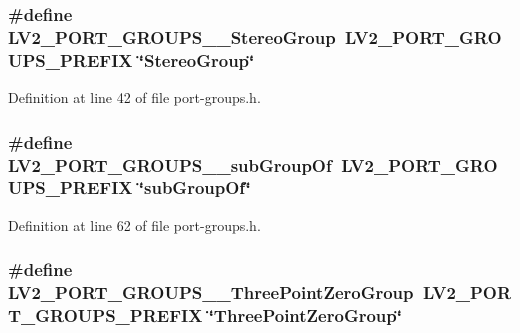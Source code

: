 \subsubsection[{\texorpdfstring{L\+V2\+\_\+\+P\+O\+R\+T\+\_\+\+G\+R\+O\+U\+P\+S\+\_\+\+\_\+\+Stereo\+Group}{LV2_PORT_GROUPS__StereoGroup}}]{\setlength{\rightskip}{0pt plus 5cm}\#define L\+V2\+\_\+\+P\+O\+R\+T\+\_\+\+G\+R\+O\+U\+P\+S\+\_\+\+\_\+\+Stereo\+Group~{\bf L\+V2\+\_\+\+P\+O\+R\+T\+\_\+\+G\+R\+O\+U\+P\+S\+\_\+\+P\+R\+E\+F\+IX} \char`\"{}Stereo\+Group\char`\"{}}\hypertarget{port-groups_8h_acc1615a1369cab145421ae7dddb26379}{}\label{port-groups_8h_acc1615a1369cab145421ae7dddb26379}


Definition at line 42 of file port-\/groups.\+h.

\subsubsection[{\texorpdfstring{L\+V2\+\_\+\+P\+O\+R\+T\+\_\+\+G\+R\+O\+U\+P\+S\+\_\+\+\_\+sub\+Group\+Of}{LV2_PORT_GROUPS__subGroupOf}}]{\setlength{\rightskip}{0pt plus 5cm}\#define L\+V2\+\_\+\+P\+O\+R\+T\+\_\+\+G\+R\+O\+U\+P\+S\+\_\+\+\_\+sub\+Group\+Of~{\bf L\+V2\+\_\+\+P\+O\+R\+T\+\_\+\+G\+R\+O\+U\+P\+S\+\_\+\+P\+R\+E\+F\+IX} \char`\"{}sub\+Group\+Of\char`\"{}}\hypertarget{port-groups_8h_a26454450a1f37fdc56391be6a1f03260}{}\label{port-groups_8h_a26454450a1f37fdc56391be6a1f03260}


Definition at line 62 of file port-\/groups.\+h.

\subsubsection[{\texorpdfstring{L\+V2\+\_\+\+P\+O\+R\+T\+\_\+\+G\+R\+O\+U\+P\+S\+\_\+\+\_\+\+Three\+Point\+Zero\+Group}{LV2_PORT_GROUPS__ThreePointZeroGroup}}]{\setlength{\rightskip}{0pt plus 5cm}\#define L\+V2\+\_\+\+P\+O\+R\+T\+\_\+\+G\+R\+O\+U\+P\+S\+\_\+\+\_\+\+Three\+Point\+Zero\+Group~{\bf L\+V2\+\_\+\+P\+O\+R\+T\+\_\+\+G\+R\+O\+U\+P\+S\+\_\+\+P\+R\+E\+F\+IX} \char`\"{}Three\+Point\+Zero\+Group\char`\"{}}\hypertarget{port-groups_8h_a619a026293a07226ccc0d913b54828cc}{}\label{port-groups_8h_a619a026293a07226ccc0d913b54828cc}


